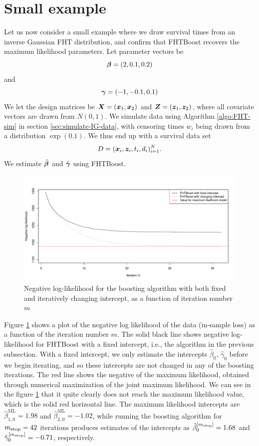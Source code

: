 \section{Small example}
\label{subsec:algo-example}
Let us now consider a small example where we draw survival times from an inverse Gaussian FHT distribution, and confirm that FHTBoost recovers the maximum likelihood parameters.
Let parameter vectors be
\begin{equation*}
    \boldsymbol{\beta}=(2,0.1,0.2)
\end{equation*}
and
\begin{equation*}
    \boldsymbol{\gamma}=(-1, -0.1, 0.1)
\end{equation*}
We let the design matrices be $\bm{X}=(\bm{x}_1,\bm{x}_2)$ and $\bm{Z}=(\bm{z}_1,\bm{z}_2)$, where all covariate vectors are drawn from $N(0,1)$.
We simulate data using Algorithm \ref{algo:FHT-sim} in section \ref{sec:simulate-IG-data}, with censoring times $w_i$ being drawn from a distribution $\exp(0.1)$.
We thus end up with a survival data set
\begin{equation*}
    D=(\bm{x}_i,\bm{z}_i,t_i,d_i)_{i=1}^N.
\end{equation*}
We estimate $\hat{\boldsymbol{\beta}}$ and $\hat{\boldsymbol{\gamma}}$ using FHTBoost.
\begin{figure}
\caption{Negative log-likelihood for the boosting algorithm with both fixed and iteratively changing intercept, as a function of iteration number $m$}
\label{fig:boosting-ML}
\centering\includegraphics[scale=0.4]{figures/small_example.pdf}
\end{figure}
Figure \ref{fig:boosting-ML} shows a plot of the negative log likelihood of the data (in-sample loss) as a function of the iteration number $m$.
The solid black line shows negative log-likelihood for FHTBoost with a fixed intercept, i.e., the algorithm in the previous subsection.
With a fixed intercept, we only estimate the intercepts $\hat{\beta}_{0},\,\hat{\gamma}_{0}$ before we begin iterating, and so these intercepts are not changed in any of the boosting iterations.
The red line shows the negative of the maximum likelihood, obtained through numerical maximization of the joint maximum likelihood.
We can see in the figure \ref{fig:boosting-ML} that it quite clearly does not reach the maximum likelihood value, which is the solid red horizontal line.
The maximum likelihood intercepts are $\hat{\beta}^{\text{ML}}_{1,0}=1.98$ and $\hat{\beta}^{\text{ML}}_{2,0}=-1.02$, while running the boosting algorithm for $m_{\text{stop}}=42$ iterations produces estimates of the intercepts as $\hat{\beta}^{[m_{\text{stop}}]}_{0}=1.68$ and $\hat{\gamma}^{[m_{\text{stop}}]}_{0}=-0.71$, respectively.

